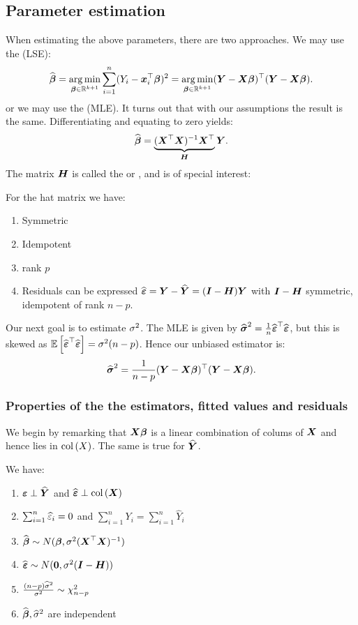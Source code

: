 \subsection{Parameter estimation}
When estimating the above parameters, there are two approaches. We may use the  (LSE): 
$$
    \Bh 
    = \argmin_{\B\in\R^{k+1}} \sum_{i=1}^n (Y_i-\x_i^\top\B)^2
    = \argmin_{\B\in\R^{k+1}} (\Y-\X\B)^\top(\Y-\X\B).
$$
or we may use the  (MLE). It turns out that with our assumptions the result is the same. Differentiating and equating to zero yields:
$$
    \Bh = \underbrace{(\X^\top\X)^{-1}\X^\top}_{\mH}\Y.
$$
The matrix $\mH$ is called the  or , and is of special interest:
\begin{proposition}
    For the hat matrix we have:
    \begin{enumerate}
        \item Symmetric
        \item Idempotent
        \item rank $p$
        \item Residuals can be expressed $\Eh=\Y-\hat{\Y} = (\mI-\mH)\Y$ with $\mI-\mH$ symmetric, idempotent of rank $n-p$.
    \end{enumerate}
\end{proposition}
Our next goal is to estimate $\s^2$. The MLE is given by $\Sh^2 = \frac{1}{n}\Eh^\top\Eh$, but this is skewed as $\ev{\Eh^\top\Eh}=\s^2(n-p)$. Hence our unbiased estimator is:
$$
    \Sh^2 = \frac{1}{n-p}(\Y-\X\B)^\top(\Y-\X\B).
$$

\subsubsection{Properties of the the estimators, fitted values and residuals}
We begin by remarking that $\X\B$ is a linear combination of colums of $\X$ and hence lies in $\col{X}$. The same is true for $\hat{\Y}$. 
\begin{proposition}
    We have:
    \begin{enumerate}
        \item $\E\perp\hat{\Y}$ and $\Eh\perp\col{\X}$
        \item $\sum_{i=1}^n \eh_i = 0$ and $\sum_{i=1}^n Y_i = \sum_{i=1}^n \hat{Y}_i$
        \item $\Bh \sim N(\B, \s^2(\X^\top\X)^{-1})$
        \item $\Eh \sim N(\zero, \s^2(\mI-\mH))$
        \item $\frac{(n-p)\sh^2}{\s^2} \sim \chi^2_{n-p}$
        \item $\Bh, \sh^2$ are independent
    \end{enumerate}
\end{proposition}

